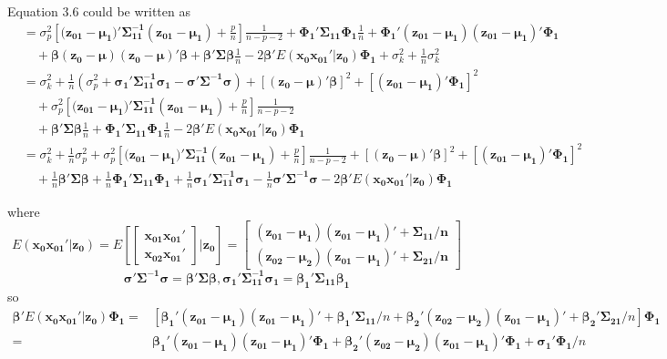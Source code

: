 \documentclass[11pt]{article}
\begin{document}
Equation 3.6 could be written as
$$\begin{aligned}
&=\sigma_p^2 \left[(\boldsymbol{z_{01}-\mu_1)'\Sigma_{11}^{-1}(z_{01}-\mu_1)}+\frac{p}{n}\right]\frac{1}{n-p-2}+\boldsymbol{\Phi_1'\Sigma_{11}\Phi_1}\frac{1}{n}+\boldsymbol{\Phi_{1}'(z_{01}-\mu_{1})(z_{01}-\mu_1)'\Phi_1}\\
&\quad+\boldsymbol{\beta}\boldsymbol{(z_0-\mu)(z_0-\mu)'\beta}+\boldsymbol{\beta'\Sigma}\boldsymbol{\beta}\frac{1}{n} -2\boldsymbol{\beta'}E(\boldsymbol{x_0x_{01}'}|\boldsymbol{z_0})\boldsymbol{\Phi_1}+\sigma_k^2+\frac{1}{n}\sigma_k^2\\
&=\sigma_k^2+\frac{1}{n}(\sigma_p^2+\boldsymbol{\sigma_1'\Sigma_{11}^{-1}\sigma_1-\sigma'\Sigma^{-1}\sigma})+[\boldsymbol{(z_{0}-\mu)'\beta}]^2+[\boldsymbol{(z_{01}-\mu_1)'\Phi_1}]^2\\
&\quad+\sigma_p^2 \left[(\boldsymbol{z_{01}-\mu_1)'\Sigma_{11}^{-1}(z_{01}-\mu_1)}+\frac{p}{n}\right]\frac{1}{n-p-2}\\
&\quad+\boldsymbol{\beta'\Sigma\beta}\frac{1}{n}+\boldsymbol{\Phi_1'\Sigma_{11}\Phi_1}\frac{1}{n}-2\boldsymbol{\beta'}E(\boldsymbol{x_0x_{01}'}|\boldsymbol{z_0})\boldsymbol{\Phi_1}\\
&=\sigma_k^2+\frac{1}{n}\sigma_p^2+\sigma_p^2 \left[(\boldsymbol{z_{01}-\mu_1)'\Sigma_{11}^{-1}(z_{01}-\mu_1)}+\frac{p}{n}\right]\frac{1}{n-p-2}
+[\boldsymbol{(z_{0}-\mu)'\beta}]^2+[\boldsymbol{(z_{01}-\mu_1)'\Phi_1}]^2\\
&\quad+\frac{1}{n}\boldsymbol{\beta'\Sigma\beta}+\frac{1}{n}\boldsymbol{\Phi_1'\Sigma_{11}\Phi_1}+\frac{1}{n}\boldsymbol{\sigma_1'\Sigma_{11}^{-1}\sigma_1}-\frac{1}{n}\boldsymbol{\sigma'\Sigma^{-1}\sigma}-2\boldsymbol{\beta'}E(\boldsymbol{x_0x_{01}'}|\boldsymbol{z_0})\boldsymbol{\Phi_1}
\end{aligned}$$

where $$E(\boldsymbol{x_0x_{01}'}|\boldsymbol{z_0})=E\left[\begin{bmatrix}
\boldsymbol{x_{01}x_{01}'}\\
\boldsymbol{x_{02}x_{01}'}
\end{bmatrix}|\boldsymbol{z_0}\right]=\begin{bmatrix}\boldsymbol{
(z_{01}-\mu_1)(z_{01}-\mu_1)'+\Sigma_{11}/n}\\
\boldsymbol{(z_{02}-\mu_2)(z_{01}-\mu_1)'+\Sigma_{21}/n}
\end{bmatrix}$$
$$\boldsymbol{\sigma'\Sigma^{-1}\sigma=\beta'\Sigma\beta}, \boldsymbol{\sigma_1'\Sigma_{11}^{-1}\sigma_1=\beta_1'\Sigma_{11}\beta_1}$$
so 
$$\begin{aligned}
\boldsymbol{\beta'}E(\boldsymbol{x_0x_{01}'}|\boldsymbol{z_0})\boldsymbol{\Phi_1}
=&[\boldsymbol{\beta_1'(z_{01}-\mu_1)(z_{01}-\mu_1)'+\beta_1'\Sigma_{11}}/n+\boldsymbol{\beta_2'(z_{02}-\mu_2)(z_{01}-\mu_1)'+\beta_2'\Sigma_{21}}/n]\boldsymbol{\Phi_1}\\
=&\boldsymbol{\beta_1'(z_{01}-\mu_1)(z_{01}-\mu_1)'\Phi_1}+\boldsymbol{\beta_2'(z_{02}-\mu_2)(z_{01}-\mu_1)'\Phi_1}+\boldsymbol{\sigma_1'\Phi_1}/n\\
\end{aligned}$$
\end{document}
